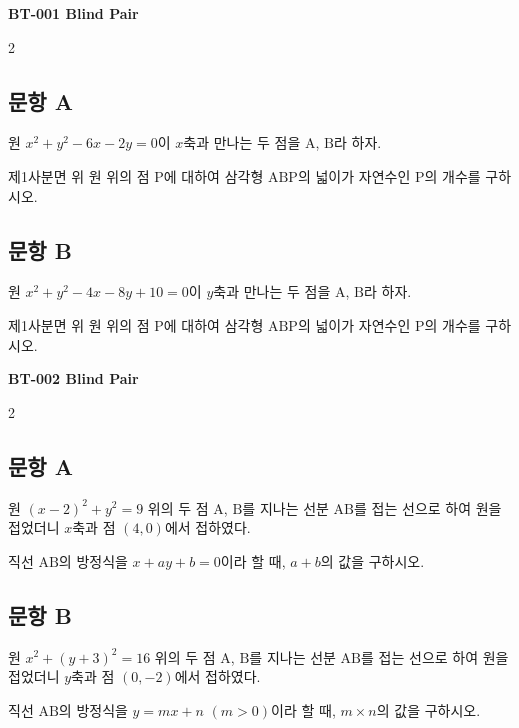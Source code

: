 \documentclass[11pt]{article}
\newcommand{\pairheader}[1]{%
  \begin{center}\textbf{\LARGE #1 Blind Pair}\end{center}
  \vspace{0.5cm}
}
\newcommand{\itemhead}[1]{\subsection*{\centering #1}\vspace{0.3cm}}
\begin{document}
\pairheader{BT-001}

\begin{multicols}{2}
\itemhead{문항 A}

원 $x^2 + y^2 - 6x - 2y = 0$이 $x$축과 만나는 두 점을 $\mathrm{A}$, $\mathrm{B}$라 하자.

\vspace{0.5em}

제1사분면 위 원 위의 점 $\mathrm{P}$에 대하여 삼각형 $\mathrm{ABP}$의 넓이가 자연수인 $\mathrm{P}$의 개수를 구하시오.

\columnbreak

\itemhead{문항 B}

원 $x^2 + y^2 - 4x - 8y + 10 = 0$이 $y$축과 만나는 두 점을 $\mathrm{A}$, $\mathrm{B}$라 하자.

\vspace{0.5em}

제1사분면 위 원 위의 점 $\mathrm{P}$에 대하여 삼각형 $\mathrm{ABP}$의 넓이가 자연수인 $\mathrm{P}$의 개수를 구하시오.
\end{multicols}

\newpage

\pairheader{BT-002}

\begin{multicols}{2}
\itemhead{문항 A}

원 $(x-2)^2 + y^2 = 9$ 위의 두 점 $\mathrm{A}$, $\mathrm{B}$를 지나는 선분 $\mathrm{AB}$를 접는 선으로 하여 원을 접었더니 $x$축과 점 $(4, 0)$에서 접하였다.

\vspace{0.5em}

직선 $\mathrm{AB}$의 방정식을 $x + ay + b = 0$이라 할 때, $a + b$의 값을 구하시오.

\columnbreak

\itemhead{문항 B}

원 $x^2 + (y+3)^2 = 16$ 위의 두 점 $\mathrm{A}$, $\mathrm{B}$를 지나는 선분 $\mathrm{AB}$를 접는 선으로 하여 원을 접었더니 $y$축과 점 $(0, -2)$에서 접하였다.

\vspace{0.5em}

직선 $\mathrm{AB}$의 방정식을 $y = mx + n$ $(m > 0)$이라 할 때, $m \times n$의 값을 구하시오.
\end{multicols}
\end{document}
